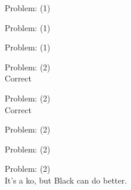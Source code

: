 \documentclass[11pt]{article}
\begin{document}
\begin{minipage}[t]{0.5\textwidth}
  {\centering
  
  Problem: (1)\\
  
  }
\end{minipage}
\begin{minipage}[t]{0.5\textwidth}
  {\centering
  
  Problem: (1)\\
  
  }
\end{minipage}
\begin{minipage}[t]{0.5\textwidth}
  {\centering
  
  Problem: (1)\\
  
  }
\end{minipage}
\begin{minipage}[t]{0.5\textwidth}
  {\centering
  
  Problem: (2)\\
  Correct\\
  }
\end{minipage}
\begin{minipage}[t]{0.5\textwidth}
  {\centering
  
  Problem: (2)\\
  Correct\\
  }
\end{minipage}
\begin{minipage}[t]{0.5\textwidth}
  {\centering
  
  Problem: (2)\\
  
  }
\end{minipage}
\begin{minipage}[t]{0.5\textwidth}
  {\centering
  
  Problem: (2)\\
  
  }
\end{minipage}
\begin{minipage}[t]{0.5\textwidth}
  {\centering
  
  Problem: (2)\\
  It's a ko, but Black can do better.\\
  }
\end{minipage}
\end{document}
